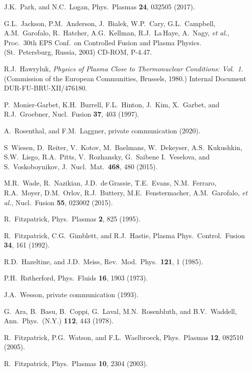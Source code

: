\documentclass[12pt,prb,aps]{revtex4-1}
\begin{document}
\begin{thebibliography}{99}
 J.K.~Park, and N.C.~Logan, Phys.\ Plasmas {\bf 24}, 032505 (2017).

 G.L.~Jackson, P.M.~Anderson, J.~Bialek, W.P.~Cary, G.L.~Campbell, A.M.~Garofalo,  R.~Hatcher, A.G.~Kellman, R.J.~La\,Haye, A.~Nagy, {\em et al.},  
Proc.\ 30th EPS Conf.\ on Controlled Fusion and Plasma Physics. (St.\ Petersburg, Russia, 2003) CD-ROM, P-4.47.

 R.J.~Hawryluk, {\em Physics of Plasma Close to Thermonuclear Conditions: Vol.~1}. (Commission of the European Communities, Brussels, 1980.) 
Internal Document DUR-FU-BRU-XII/476180.

 P.~Monier-Garbet, K.H.~Burrell, F.L.~Hinton, J.~Kim, X.~Garbet, and R.J.~Groebner,   
Nucl.\ Fusion  {\bf 37}, 403 (1997).

 A.~Rosenthal, and F.M.~Laggner, private communication (2020).

 S~Wiesen, D.~Reiter, V.~Kotov, M.~Baelmans, W.~Dekeyser, A.S.~Kukushkin, S.W.~Lisgo, R.A.~Pitts, V.~Rozhansky, G.~Saibene I.~Veselova, and S.~Voskoboynikov,
J.\ Nucl.\ Mat.\ {\bf 468}, 480 (2015).

 M.R.~Wade, R.~Nazikian, J.D.~de\,Grassie, T.E.~Evans, N.M.~Ferraro, R.A.~Moyer, D.M.~Orlov, 
R.J.~Buttery, M.E.~Fenstermacher, A.M.~Garofalo, {\em et al.}, Nucl.\ Fusion {\bf 55}, 023002 (2015). 

 R.~Fitzpatrick,  Phys.\ Plasmas {\bf 2}, 825 (1995).

 R.~Fitzpatrick, C.G.~Gimblett, and R.J.~Hastie, 
Plasma Phys.\ Control.\ Fusion {\bf 34}, 161 (1992).

 R.D.~Hazeltine, and J.D.~Meiss, Rev.\ Mod.\ Phys.\ {\bf 121}, 1 (1985).

 P.H.~Rutherford,  Phys.\ Fluids  {\bf 16}, 1903 (1973).

 J.A.~Wesson, private communication (1993).

 G.~Ara,  B.~Basu, B.~Coppi, G.~Laval, M.N.~Rosenbluth, and B.V.~Waddell, Ann.\ Phys.\ (N.Y.) {\bf 112}, 443 (1978). 

 R.~Fitzpatrick, P.G.~Watson, and F.L.~Waelbroeck, Phys.\ Plasmas {\bf 12}, 082510 (2005).

 R.~Fitzpatrick, Phys.\ Plasmas {\bf 10}, 2304 (2003).

\end{thebibliography}
\end{document}
